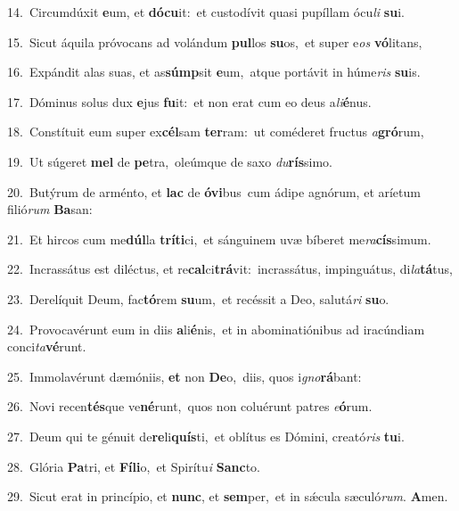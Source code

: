 {\numbfont\textcolor{\numbcolor}{14.}}~Circumdúxit \textbf{e}\-um, et \textbf{dó}\-\textbf{cu}it:~\star et custodívit quasi pupíllam ócu\textit{li} \textbf{su}\-i.\par
{\numbfont\textcolor{\numbcolor}{15.}}~Sicut áquila próvocans ad volándum \textbf{pul}\-los \textbf{su}\-os,~\star et super e\textit{os} \textbf{vó}\-litans,\par
{\numbfont\textcolor{\numbcolor}{16.}}~Expándit alas suas, et as\-\textbf{súmp}\-sit \textbf{e}\-um,~\star atque portávit in húme\textit{ris} \textbf{su}\-is.\par
{\numbfont\textcolor{\numbcolor}{17.}}~Dóminus solus dux \textbf{e}\-jus \textbf{fu}\-it:~\star et non erat cum eo deus a\-\textit{li}\-\textbf{é}nus.\par
{\numbfont\textcolor{\numbcolor}{18.}}~Constítuit eum super ex\-\textbf{cél}\-sam \textbf{ter}\-ram:~\star ut coméderet fructus \textit{a}\-\textbf{gró}rum,\par
{\numbfont\textcolor{\numbcolor}{19.}}~Ut súgeret \textbf{mel} de \textbf{pe}\-tra,~\star oleúmque de saxo \textit{du}\-\textbf{rís}simo.\par
{\numbfont\textcolor{\numbcolor}{20.}}~Butýrum de arménto, et \textbf{lac} de \textbf{ó}\-\textbf{vi}bus~\star cum ádipe agnórum, et aríetum filió\textit{rum} \textbf{Ba}\-san:\par
{\numbfont\textcolor{\numbcolor}{21.}}~Et hircos cum me\-\textbf{dúl}\-la \textbf{trí}\-\textbf{ti}ci,~\star et sánguinem uvæ bíberet me\-\textit{ra}\-\textbf{cís}simum.\par
{\numbfont\textcolor{\numbcolor}{22.}}~Incrassátus est diléctus, et re\-\textbf{cal}\-ci\-\textbf{trá}\-vit:~\star incrassátus, impinguátus, di\-\textit{la}\-\textbf{tá}tus,\par
{\numbfont\textcolor{\numbcolor}{23.}}~Derelíquit Deum, fac\-\textbf{tó}\-rem \textbf{su}\-um,~\star et recéssit a Deo, salutá\textit{ri} \textbf{su}\-o.\par
{\numbfont\textcolor{\numbcolor}{24.}}~Provocavérunt eum in diis \textbf{a}\-li\-\textbf{é}\-nis,~\star et in abominatiónibus ad iracúndiam conci\-\textit{ta}\-\textbf{vé}runt.\par
{\numbfont\textcolor{\numbcolor}{25.}}~Immolavérunt dæmóniis, \textbf{et} non \textbf{De}\-o,~\star diis, quos i\-\textit{gno}\-\textbf{rá}bant:\par
{\numbfont\textcolor{\numbcolor}{26.}}~Novi recen\-\textbf{tés}\-que ve\-\textbf{né}\-runt,~\star quos non coluérunt patres \textit{e}\-\textbf{ó}rum.\par
{\numbfont\textcolor{\numbcolor}{27.}}~Deum qui te génuit de\-\textbf{re}\-li\-\textbf{quís}\-ti,~\star et oblítus es Dómini, creató\textit{ris} \textbf{tu}\-i.\par
{\numbfont\textcolor{\numbcolor}{28.}}~Glória \textbf{Pa}\-tri, et \textbf{Fí}\-\textbf{li}o,~\star et Spirítu\textit{i} \textbf{Sanc}\-to.\par
{\numbfont\textcolor{\numbcolor}{29.}}~Sicut erat in princípio, et \textbf{nunc}\-, et \textbf{sem}\-per,~\star et in sǽcula sæculó\-\textit{rum}\-. \textbf{A}\-men.\par
